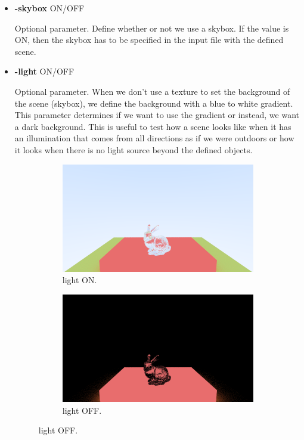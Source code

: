 \documentclass[titlepage,12pt]{report}
\begin{document}
\begin{itemize}
\item \textbf{-skybox} ON/OFF

Optional parameter. Define whether or not we use a skybox. If the value is ON, then the skybox has to be specified in the input file with the defined scene.

\item \textbf{-light} ON/OFF

Optional parameter. When we don't use a texture to set the background of the scene (skybox), we define the background with a blue to white gradient. This parameter determines if we want to use the gradient or instead, we want a dark background. This is useful to test how a scene looks like when it has an illumination that comes from all directions as if we were outdoors or how it looks when there is no light source beyond the defined objects.

\begin{figure}[H]
	\centering
	\medskip
	\begin{subfigure}{.48\textwidth}
		\centering
		\includegraphics[scale=0.315]{media/bunny.png}
		\caption{light ON.}
		\label{light1}
	\end{subfigure}
	\begin{subfigure}{.48\textwidth}
		\centering
		\includegraphics[scale=0.315]{media/bunny_noktem.png}
		\caption{light OFF.}
		\label{light2}
	\end{subfigure}
\end{figure}


\end{itemize}
\end{document}
